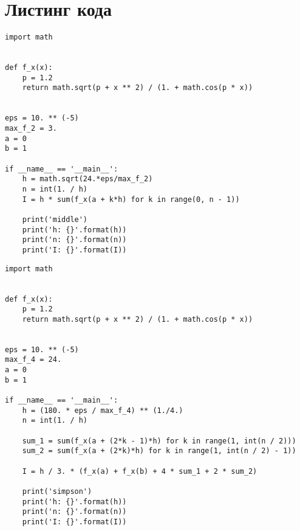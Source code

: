 \documentclass[12pt]{article}
\makeatletter
\newcommand{\verbatimfont}[1]{\renewcommand{\verbatim@font}{\ttfamily#1}}
\makeatother
\begin{document}
\section{Листинг кода}
\verbatimfont{\small}
\begin{verbatim}
import math


def f_x(x):
    p = 1.2
    return math.sqrt(p + x ** 2) / (1. + math.cos(p * x))


eps = 10. ** (-5)
max_f_2 = 3.
a = 0
b = 1

if __name__ == '__main__':
    h = math.sqrt(24.*eps/max_f_2)
    n = int(1. / h)
    I = h * sum(f_x(a + k*h) for k in range(0, n - 1))

    print('middle')
    print('h: {}'.format(h))
    print('n: {}'.format(n))
    print('I: {}'.format(I))
\end{verbatim}
\newpage
\verbatimfont{\small}
\begin{verbatim}
import math


def f_x(x):
    p = 1.2
    return math.sqrt(p + x ** 2) / (1. + math.cos(p * x))


eps = 10. ** (-5)
max_f_4 = 24.
a = 0
b = 1

if __name__ == '__main__':
    h = (180. * eps / max_f_4) ** (1./4.)
    n = int(1. / h)

    sum_1 = sum(f_x(a + (2*k - 1)*h) for k in range(1, int(n / 2)))
    sum_2 = sum(f_x(a + (2*k)*h) for k in range(1, int(n / 2) - 1))

    I = h / 3. * (f_x(a) + f_x(b) + 4 * sum_1 + 2 * sum_2)

    print('simpson')
    print('h: {}'.format(h))
    print('n: {}'.format(n))
    print('I: {}'.format(I))
\end{verbatim}
\end{document}
